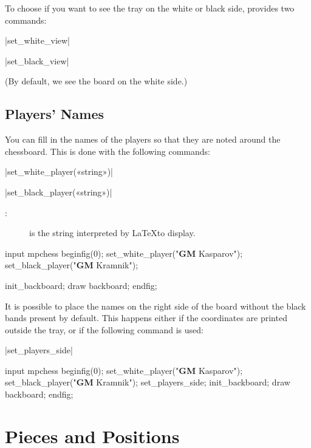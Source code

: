 \documentclass[english]{ltxdoc}
\begin{document}
To choose if you want to see the tray on the white or black side, \mpchess
provides two commands:

\commande|set_white_view|\smallskip

\commande|set_black_view|\smallskip

(By default, we see the board on the white side.)

\subsection{Players' Names}

You can fill in the names of the players so that they are noted around the
chessboard. This is done with the following commands: 

\commande|set_white_player(«string»)|\smallskip

\commande|set_black_player(«string»)|\smallskip

\begin{description}
  \item[ :] is the string interpreted by \LaTeX to display.
\end{description}

\begin{ExempleMP}
input mpchess
beginfig(0);
set_white_player("\textbf{GM} Kasparov");
set_black_player("\textbf{GM} Kramnik");

init_backboard;
draw backboard;
endfig;
\end{ExempleMP}

It is possible to place the names on the right side of the board without the
black bands present by default. 
This happens either if the coordinates are printed outside the tray, or if the
following command is used:

\commande|set_players_side|\smallskip

\begin{ExempleMP}[righthand width=0.6\linewidth]
input mpchess
beginfig(0);
set_white_player("\textbf{GM} Kasparov");
set_black_player("\textbf{GM} Kramnik");
set_players_side;
init_backboard;
draw backboard;
endfig;
\end{ExempleMP}



\section{Pieces and Positions}
\end{document}
